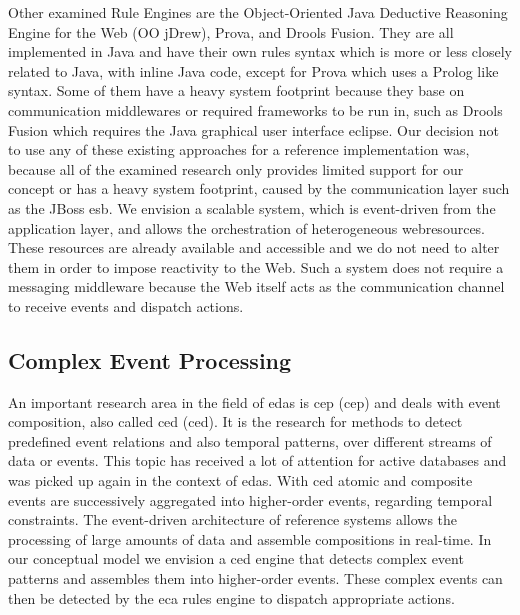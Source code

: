 Other examined Rule Engines are the \textrm{Object-Oriented Java Deductive Reasoning Engine for the Web} (\textrm{OO jDrew}), \textrm{Prova}, and \textrm{Drools Fusion}.
They are all implemented in \textrm{Java} and have their own rules syntax which is more or less closely related to \textrm{Java}, with inline \textrm{Java} code, except for \textrm{Prova} which uses a \textrm{Prolog} like syntax.
Some of them have a heavy system footprint because they base on communication middlewares or required frameworks to be run in, such as \textrm{Drools Fusion} which requires the Java graphical user interface \textrm{eclipse}. %
Our decision not to use any of these existing approaches for a reference implementation was, because all of the examined research only provides limited support for our concept or has a heavy system footprint, caused by the communication layer such as the \textrm{JBoss \acrshort{esb}}.
We envision a scalable system, which is event-driven from the application layer, and allows the orchestration of heterogeneous \textrm{\glspl{webresource}}.
These resources are already available and accessible and we do not need to alter them in order to impose reactivity to the Web.
Such a system does not require a messaging middleware because the Web itself acts as the communication channel to receive events and dispatch actions.


\subsection{Complex Event Processing}
An important research area in the field of \textrm{\acrlong{eda}s} is \textrm{\acrlong{cep} (\acrshort{cep})}\cite{anicic2010arlfcepar} and deals with event composition, also called \textrm{\acrlong{ced} (\acrshort{ced})}\cite{akdere2008plan}\cite{2004_1265833}.
It is the research for methods to detect predefined event relations and also temporal patterns, over different streams of data or events.
This topic has received a lot of attention for active databases\cite{Adaikkalavan2007}\cite{Gehani92compositeevent}\cite{Zimmer99onthe} and was picked up again in the context of \textrm{\acrlong{eda}s}.
With \textrm{\acrshort{ced}} atomic and composite events are successively aggregated into higher-order events, regarding temporal constraints.
The event-driven architecture of reference systems allows the processing of large amounts of data and assemble compositions in real-time.
In our conceptual model we envision a \textrm{\acrshort{ced}} engine that detects complex event patterns and assembles them into higher-order events.
These complex events can then be detected by the \textrm{\acrshort{eca}} rules engine to dispatch appropriate actions.



